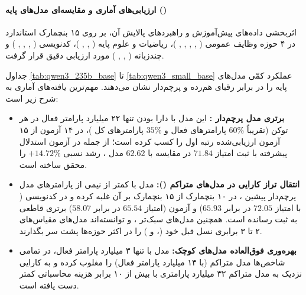 \paragraph*{ارزیابی‌های آماری و مقایسه‌ای مدل‌های پایه ()}
اثربخشی داده‌های پیش‌آموزش و راهبردهای پالایش آن، بر روی ۱۵ بنچمارک استاندارد در ۴ حوزه وظایف عمومی ( \cite{hendrycks2021mmlu},  \cite{gema2024are},  \cite{wang2024mmlupro},  \cite{suzgun2023challenging},  \cite{du2025supergpqa})، ریاضیات و علوم پایه ( \cite{rein2023gpqa},  \cite{cobbe2021training},  \cite{hendrycks2021math})، کدنویسی ( \cite{liu2023evalplus},  \cite{cassano2023multipl},  \cite{austin2021program},  \cite{gu2024cruxeval}) و چندزبانه ( \cite{shi2023language},  \cite{openai2024mmmlu},  \cite{romanou2024include}) مورد ارزیابی دقیق قرار گرفت. 

جداول \ref{tab:qwen3_235b_base} تا \ref{tab:qwen3_small_base} عملکرد کمّی مدل‌های پایه را در برابر رقبای هم‌رده و پرچم‌دار نشان می‌دهند. مهم‌ترین یافته‌های آماری به شرح زیر است:
\begin{itemize}
    \item \textbf{برتری مدل پرچم‌دار :} این مدل با دارا بودن تنها ۲۲ میلیارد پارامتر فعال در هر توکن (تقریباً $60\%$ پارامترهای فعال و $35\%$ پارامترهای کل  \cite{liu2024deepseekv3})، در ۱۴ آزمون از ۱۵ آزمون ارزیابی‌شده رتبه اول را کسب کرده است؛ از جمله در آزمون استدلال پیشرفته  با ثبت امتیاز $71.84$ در مقایسه با $62.62$ مدل ، رشد نسبی $+14.72\%$ را محقق ساخته است.
    \item \textbf{انتقال تراز کارایی در مدل‌های متراکم ():} مدل  با کمتر از نیمی از پارامترهای مدل پرچم‌دار پیشین ، در ۱۰ بنچمارک از ۱۵ بنچمارک بر آن غلبه کرده و در کدنویسی ( با امتیاز $72.05$ در برابر $65.93$) و آزمون  (امتیاز $65.54$ در برابر $58.07$) برتری قاطعی به ثبت رسانده است. همچنین مدل‌های سبک‌تر ،  و  توانسته‌اند مدل‌های مقیاس‌های ۲ تا ۳ برابری نسل قبل خود (،  و ) را در اکثر حوزه‌ها پشت سر بگذارند.
    \item \textbf{بهره‌وری فوق‌العاده مدل‌های  کوچک:} مدل  با تنها ۳ میلیارد پارامتر فعال، در تمامی شاخص‌ها مدل متراکم  (با ۱۴ میلیارد پارامتر فعال) را مغلوب کرده و به کارایی نزدیک به مدل متراکم ۳۲ میلیارد پارامتری با بیش از ۱۰ برابر هزینه محاسباتی کمتر دست یافته است.
\end{itemize}

